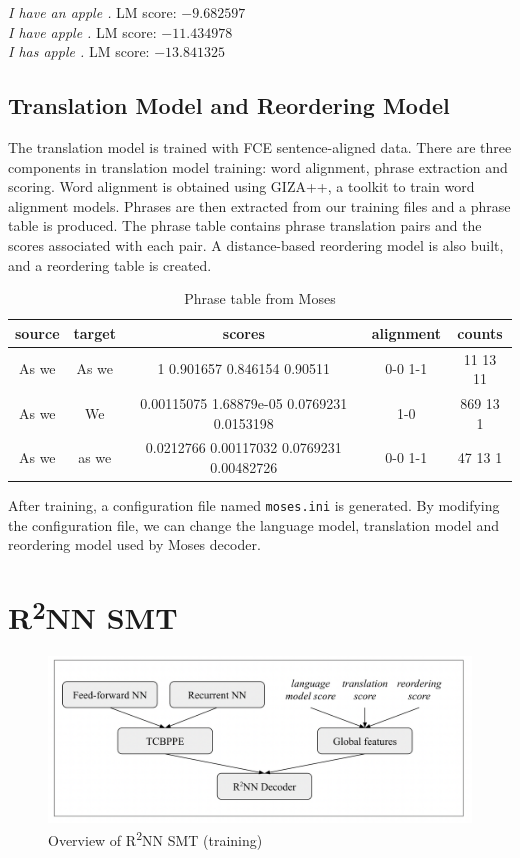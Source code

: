 \documentclass[12pt,a4paper,twoside,openright]{report}
\begin{document}
\hfill\begin{minipage}{\dimexpr\textwidth-1cm}
    \textit{I have an apple .} LM score: $-9.682597$\\
    \textit{I have apple .} LM score: $-11.434978$\\
    \textit{I has apple .} LM score: $-13.841325$
\end{minipage}

\subsection{Translation Model and Reordering Model}
The translation model is trained with FCE sentence-aligned data. There are three components in translation model training: word alignment, phrase extraction and scoring. Word alignment is obtained using GIZA++, a toolkit to train word alignment models. Phrases are then extracted from our training files and a phrase table is produced. The phrase table contains phrase translation pairs and the scores associated with each pair. A distance-based reordering model is also built, and a reordering table is created. 

\begin{table}[ht]
\centering
\begin{tabular}{ |c|c|c|c|c| } 
 \hline
 source & target & scores & alignment & counts \\ [0.5ex] 
 \hline
 As we & As we & 1 0.901657 0.846154 0.90511 & 0-0 1-1 & 11 13 11\\
 As we & We & 0.00115075 1.68879e-05 0.0769231 0.0153198 & 1-0 & 869 13 1\\
 As we & as we & 0.0212766 0.00117032 0.0769231 0.00482726 & 0-0 1-1 & 47 13 1\\
 \hline
\end{tabular}
\caption{Phrase table from Moses}
\label{table:phrase_table}
\end{table}

After training, a configuration file named \texttt{moses.ini} is generated. By modifying the configuration file, we can change the language model, translation model and reordering model used by Moses decoder.

\section{\texorpdfstring{R\textsuperscript{2}NN}{R2NN} SMT}

\begin{figure}[ht]
\centering
\includegraphics[width=1\textwidth]{images/r2nn_pipeline.png}
\caption{Overview of R\textsuperscript{2}NN SMT (training)}
\label{fig:r2nn_pipeline}
\end{figure}
\end{document}
